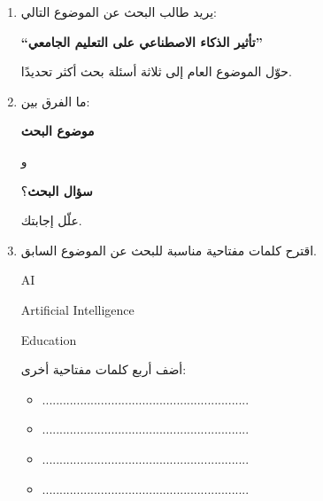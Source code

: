 \documentclass[a4paper]{article}
\begin{document}
\begin{enumerate}

\item يريد طالب البحث عن الموضوع التالي:

\begin{center}

\textbf{
``تأثير الذكاء الاصطناعي على التعليم الجامعي''
}

\end{center}

حوّل الموضوع العام إلى ثلاثة أسئلة بحث أكثر تحديدًا.



\item ما الفرق بين:

\begin{center}

\textbf{موضوع البحث}

\qquad و \qquad

\textbf{سؤال البحث}؟

\end{center}

علّل إجابتك.


\item اقترح كلمات مفتاحية مناسبة للبحث عن الموضوع
السابق.

\begin{center}

\textenglish{AI}

\qquad
\textenglish{Artificial Intelligence}

\qquad
\textenglish{Education}

\end{center}

أضف أربع كلمات مفتاحية أخرى:

\begin{itemize}

    \item ............................................................

    \item ............................................................

    \item ............................................................

    \item ............................................................

\end{itemize}


\end{enumerate}
\end{document}
